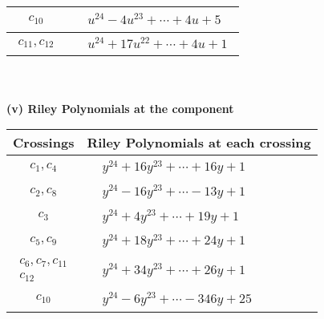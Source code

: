 \documentclass[1p]{elsarticle_modified}
\theoremstyle{definition}
\begin{document}
\begin{tabular}{m{50pt}|m{274pt}}
\hline $$\begin{aligned}c_{10}\end{aligned}$$&$\begin{aligned}
&u^{24}-4 u^{23}+\cdots+4 u+5
\end{aligned}$\\
\hline $$\begin{aligned}c_{11},c_{12}\end{aligned}$$&$\begin{aligned}
&u^{24}+17 u^{22}+\cdots+4 u+1
\end{aligned}$\\
\hline
\end{tabular}\\~\\
\newpage\renewcommand{\arraystretch}{1}
\flushleft \textbf{(v) Riley Polynomials at the component}\newline \\
\begin{tabular}{m{50pt}|m{274pt}}
Crossings & \hspace{64pt}Riley Polynomials at each crossing \\
\hline $$\begin{aligned}c_{1},c_{4}\end{aligned}$$&$\begin{aligned}
&y^{24}+16 y^{23}+\cdots+16 y+1
\end{aligned}$\\
\hline $$\begin{aligned}c_{2},c_{8}\end{aligned}$$&$\begin{aligned}
&y^{24}-16 y^{23}+\cdots-13 y+1
\end{aligned}$\\
\hline $$\begin{aligned}c_{3}\end{aligned}$$&$\begin{aligned}
&y^{24}+4 y^{23}+\cdots+19 y+1
\end{aligned}$\\
\hline $$\begin{aligned}c_{5},c_{9}\end{aligned}$$&$\begin{aligned}
&y^{24}+18 y^{23}+\cdots+24 y+1
\end{aligned}$\\
\hline $$\begin{aligned}c_{6},c_{7},c_{11}\\c_{12}\end{aligned}$$&$\begin{aligned}
&y^{24}+34 y^{23}+\cdots+26 y+1
\end{aligned}$\\
\hline $$\begin{aligned}c_{10}\end{aligned}$$&$\begin{aligned}
&y^{24}-6 y^{23}+\cdots-346 y+25
\end{aligned}$\\
\hline
\end{tabular}\\~\\
\end{document}
